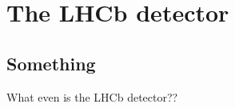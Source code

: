 \chapter{The LHCb detector} 
\label{ch:detector}
\minitoc

\section{Something}

What even is the LHCb detector?? 
